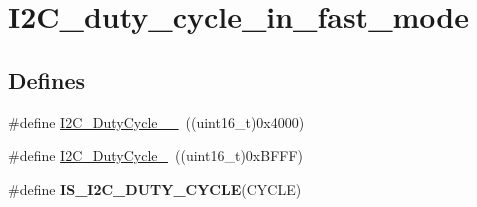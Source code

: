\hypertarget{group__I2C__duty__cycle__in__fast__mode}{
\section{I2C\_\-duty\_\-cycle\_\-in\_\-fast\_\-mode}
\label{group__I2C__duty__cycle__in__fast__mode}
}
\subsection*{Defines}
\begin{DoxyCompactItemize}
\item 
\#define \hyperlink{group__I2C__duty__cycle__in__fast__mode_ga2b4ff186808a8095fc2d1b8193f30ce1}{I2C\_\-DutyCycle\_\_}~((uint16\_\-t)0x4000)
\item 
\#define \hyperlink{group__I2C__duty__cycle__in__fast__mode_gafe0af31970aceef0fa8df6a10bef35db}{I2C\_\-DutyCycle\_}~((uint16\_\-t)0xBFFF)
\item 
\#define {\bfseries IS\_\-I2C\_\-DUTY\_\-CYCLE}(CYCLE)
\end{DoxyCompactItemize}


